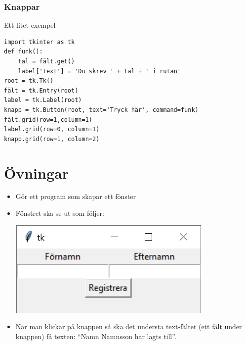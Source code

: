 \documentclass[aspectratio=169]{beamer}
\begin{document}
\begin{frame}[fragile]
	\frametitle{Knappar}
	
	Ett litet exempel
	
	\begin{lstlisting}
import tkinter as tk
def funk():
    tal = fält.get()
    label['text'] = 'Du skrev ' + tal + ' i rutan'
root = tk.Tk()
fält = tk.Entry(root)
label = tk.Label(root)
knapp = tk.Button(root, text='Tryck här', command=funk)
fält.grid(row=1,column=1)
label.grid(row=0, column=1)
knapp.grid(row=1, column=2)
	\end{lstlisting}
	
\end{frame}


\section{Övningar}

\begin{frame}
	\begin{itemize}
		\item Gör ett program som skapar ett fönster
		\item Fönstret ska se ut som följer:
			\begin{center}
				\includegraphics[]{window.png}
			\end{center}		
		\item När man klickar på knappen så ska det understa text-fältet (ett fält under knappen) få texten: ``Namn Namnsson har lagts till''. 
	\end{itemize}
\end{frame}
\end{document}
